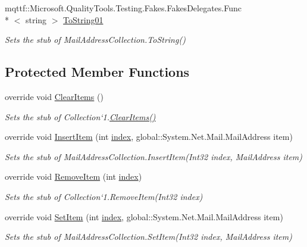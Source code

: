 \begin{DoxyCompactItemize}
mqttf\-::\-Microsoft.\-Quality\-Tools.\-Testing.\-Fakes.\-Fakes\-Delegates.\-Func\\*
$<$ string $>$ \hyperlink{class_system_1_1_net_1_1_mail_1_1_fakes_1_1_stub_mail_address_collection_ad375f7bbae8c94560e48c084f7c03a8a}{To\-String01}
\begin{DoxyCompactList}\small\item\em Sets the stub of Mail\-Address\-Collection.\-To\-String()\end{DoxyCompactList}\end{DoxyCompactItemize}
\subsection*{Protected Member Functions}
\begin{DoxyCompactItemize}
\item 
override void \hyperlink{class_system_1_1_net_1_1_mail_1_1_fakes_1_1_stub_mail_address_collection_a3b0b325b989652f4c5ca9e7aa23e716f}{Clear\-Items} ()
\begin{DoxyCompactList}\small\item\em Sets the stub of Collection`1.\hyperlink{class_system_1_1_net_1_1_mail_1_1_fakes_1_1_stub_mail_address_collection_a3b0b325b989652f4c5ca9e7aa23e716f}{Clear\-Items()}\end{DoxyCompactList}\item 
override void \hyperlink{class_system_1_1_net_1_1_mail_1_1_fakes_1_1_stub_mail_address_collection_aaf57717aa7007850a9d77754355cd55f}{Insert\-Item} (int \hyperlink{jquery-1_810_82-vsdoc_8js_a75bb12d1f23302a9eea93a6d89d0193e}{index}, global\-::\-System.\-Net.\-Mail.\-Mail\-Address item)
\begin{DoxyCompactList}\small\item\em Sets the stub of Mail\-Address\-Collection.\-Insert\-Item(\-Int32 index, Mail\-Address item)\end{DoxyCompactList}\item 
override void \hyperlink{class_system_1_1_net_1_1_mail_1_1_fakes_1_1_stub_mail_address_collection_a6db0feae63e241e0a7e6a5ca808e5c59}{Remove\-Item} (int \hyperlink{jquery-1_810_82-vsdoc_8js_a75bb12d1f23302a9eea93a6d89d0193e}{index})
\begin{DoxyCompactList}\small\item\em Sets the stub of Collection`1.Remove\-Item(\-Int32 index)\end{DoxyCompactList}\item 
override void \hyperlink{class_system_1_1_net_1_1_mail_1_1_fakes_1_1_stub_mail_address_collection_a28b782d099a2dcda4fe5c0e325cdd349}{Set\-Item} (int \hyperlink{jquery-1_810_82-vsdoc_8js_a75bb12d1f23302a9eea93a6d89d0193e}{index}, global\-::\-System.\-Net.\-Mail.\-Mail\-Address item)
\begin{DoxyCompactList}\small\item\em Sets the stub of Mail\-Address\-Collection.\-Set\-Item(\-Int32 index, Mail\-Address item)\end{DoxyCompactList}\end{DoxyCompactItemize}
